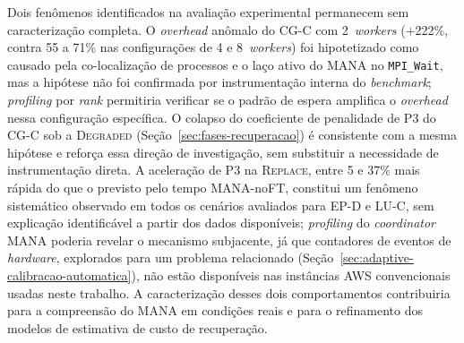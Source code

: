 Dois fenômenos identificados na avaliação experimental permanecem sem caracterização
completa. O \textit{overhead} anômalo do CG-C com 2~\textit{workers} ($+$222\%, contra
55 a 71\% nas configurações de 4 e 8~\textit{workers}) foi hipotetizado como causado
pela co-localização de processos e o laço ativo do MANA no \texttt{MPI\_Wait}, mas a
hipótese não foi confirmada por instrumentação interna do \textit{benchmark};
\textit{profiling} por \textit{rank} permitiria verificar se o padrão de espera amplifica
o \textit{overhead} nessa configuração específica. O colapso do coeficiente de
penalidade de P3 do CG-C sob a \textsc{Degraded}
(Seção~\ref{sec:fases-recuperacao}) é consistente com a mesma hipótese e reforça
essa direção de investigação, sem substituir a necessidade de instrumentação
direta. A aceleração de P3 na
\textsc{Replace}, entre 5 e 37\% mais rápida do que o previsto pelo tempo
MANA-noFT, constitui um fenômeno sistemático observado em todos os cenários avaliados
para EP-D e LU-C, sem explicação identificável a partir dos dados disponíveis;
\textit{profiling} do \textit{coordinator} MANA poderia revelar o mecanismo
subjacente, já que contadores de eventos de \textit{hardware}, explorados para um
problema relacionado (Seção~\ref{sec:adaptive-calibracao-automatica}), não estão
disponíveis nas instâncias AWS convencionais usadas neste trabalho. A
caracterização desses dois comportamentos contribuiria para a compreensão do MANA em
condições reais e para o refinamento dos modelos de estimativa de custo de recuperação.


